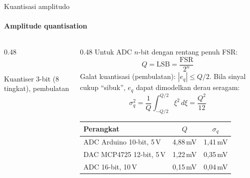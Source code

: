 \documentclass[aspectratio=169,10pt]{beamer}
\begin{document}
\begin{frame}{Kuantisasi amplitudo}
	\framesubtitle{Amplitude quantisation}
	\begin{columns}[c]
		\begin{column}{0.48\textwidth}
			\centering
			\\
			{\scriptsize Kuantiser 3-bit (8 tingkat), pembulatan}
		\end{column}
		\begin{column}{0.48\textwidth}
			\small
			Untuk ADC $n$-bit dengan rentang penuh FSR:
			\[
				Q = \text{LSB} = \frac{\text{FSR}}{2^n}
			\]
			Galat kuantisasi (pembulatan): $|e_q| \le Q/2$. Bila sinyal cukup ``sibuk'', $e_q$ dapat dimodelkan derau seragam:
			\[
				\sigma_q^2 = \frac{1}{Q}\int_{-Q/2}^{Q/2} \xi^2\,d\xi = \frac{Q^2}{12}
			\]
			\scriptsize
			\renewcommand{\arraystretch}{1.2}
			\begin{tabular}{@{}l c c@{}}
				\toprule
				Perangkat & $Q$ & $\sigma_q$ \\
				\midrule
				ADC Arduino 10-bit, 5\,V & 4,88\,mV & 1,41\,mV \\
				DAC MCP4725 12-bit, 5\,V & 1,22\,mV & 0,35\,mV \\
				ADC 16-bit, 10\,V & 0,15\,mV & 0,04\,mV \\
				\bottomrule
			\end{tabular}
		\end{column}
	\end{columns}
\end{frame}
\end{document}
